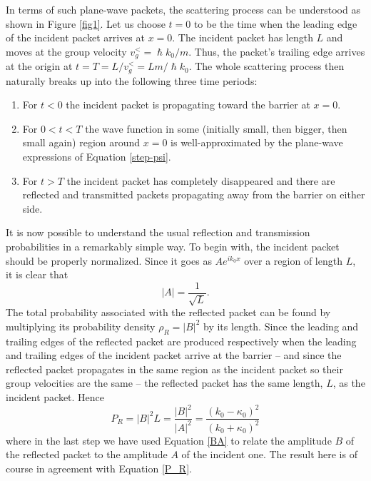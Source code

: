 \documentclass[aps,prc,onecolumn,letterpaper,floatfix,12pt]{revtex4}
\renewcommand{\hbar}{\hslash}
\begin{document}
In terms of such plane-wave packets, the scattering process can be
understood as shown in Figure \ref{fig1}.  Let us choose $t=0$ to be
the time when the leading edge of the incident packet arrives at
$x=0$.  The incident packet has length $L$
and moves at the group velocity $v_g^< = \hbar k_0 / m$.  Thus, the
packet's trailing edge arrives at the origin at $t = T = L/v_g^< = Lm/\hbar
k_0$.  The whole scattering process then naturally breaks up into the
following three time periods:
\begin{enumerate}
\item For $t<0$ the incident packet is propagating toward the barrier
  at $x=0$.
\item For $0 < t < T$ the wave function in some
  (initially small, then bigger, then small again) region around $x=0$
  is well-approximated by the plane-wave expressions of Equation
  \eqref{step-psi}.  
\item For $t > T$ the incident packet has completely
  disappeared and there are reflected and transmitted packets
  propagating away from the barrier on either side.
\end{enumerate}
It is now possible to understand the usual reflection and transmission
probabilities in a remarkably simple way.  To begin with, the
incident packet should be properly normalized.  Since it goes as $A
e^{i k_0 x}$ over a region of length $L$, it is clear that 
\begin{equation}
|A| = \frac{1}{\sqrt{L}}.
\end{equation}
The total probability associated with the reflected packet can be
found by multiplying its probability density $\rho_R = |B|^2$ by its
length.  Since the leading and trailing edges of the reflected packet
are produced respectively when the leading and trailing edges of
the incident packet arrive at the barrier -- and since the reflected
packet propagates in the same region as the incident packet so their
group velocities are the same -- the reflected packet has the same
length, $L$, as the incident packet.  Hence
\begin{equation}
P_R = |B|^2 L =\frac{|B|^2}{|A|^2} =
\frac{(k_0-\kappa_0)^2}{(k_0+\kappa_0)^2}
\end{equation}
where in the last step we have used Equation \eqref{BA} to relate the amplitude $B$ of
the reflected packet to the amplitude $A$ of the incident one. 
The result here is of course in agreement with Equation \eqref{P_R}.  
\end{document}
